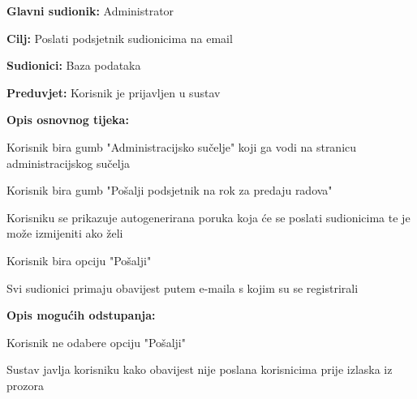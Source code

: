 				\noindent {}
					
					\begin{packed_item}
						
						\item \textbf{Glavni sudionik: } Administrator
						\item  \textbf{Cilj:} Poslati podsjetnik sudionicima na email
						\item  \textbf{Sudionici:} Baza podataka
						\item  \textbf{Preduvjet:} Korisnik je prijavljen u sustav
						\item  \textbf{Opis osnovnog tijeka:}
						
						\item[] \begin{packed_enum}
							\item Korisnik bira gumb "Administracijsko sučelje" koji ga vodi na stranicu administracijskog sučelja
							\item Korisnik bira gumb "Pošalji podsjetnik na rok za predaju radova"
							\item Korisniku se prikazuje autogenerirana poruka koja će se poslati sudionicima te je može izmijeniti ako želi
							\item Korisnik bira opciju "Pošalji"
							\item Svi sudionici primaju obavijest putem e-maila s kojim su se registrirali
							
							
							
						\end{packed_enum}
						
						\item \textbf{Opis mogućih odstupanja:}
							\item[] \begin{packed_enum}
								\item[3.a] Korisnik ne odabere opciju "Pošalji"
								\item[] \begin{packed_enum}
									\item[1.] Sustav javlja korisniku kako obavijest nije poslana korisnicima prije izlaska iz prozora
							\end{packed_enum}
						\end{packed_enum}
						
						
					\end{packed_item}
				\noindent {}

